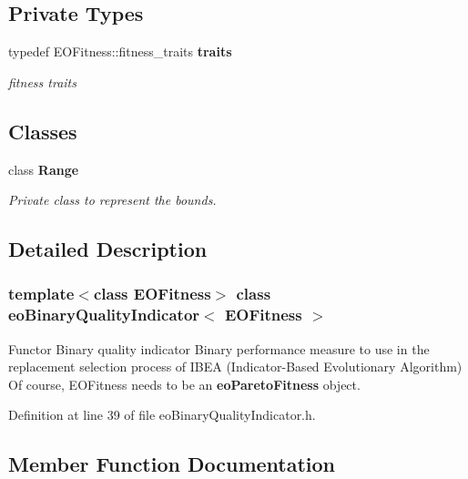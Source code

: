 \subsection*{Private Types}
\begin{CompactItemize}
\item 
typedef EOFitness::fitness\_\-traits {\bf traits}\label{classeoBinaryQualityIndicator_3d9415cfa63d3dd57fe44f9e11df3cac}

\begin{CompactList}\small\item\em fitness traits \item\end{CompactList}\end{CompactItemize}
\subsection*{Classes}
\begin{CompactItemize}
\item 
class {\bf Range}
\begin{CompactList}\small\item\em Private class to represent the bounds. \item\end{CompactList}\end{CompactItemize}


\subsection{Detailed Description}
\subsubsection*{template$<$class EOFitness$>$ class eo\-Binary\-Quality\-Indicator$<$ EOFitness $>$}

Functor Binary quality indicator Binary performance measure to use in the replacement selection process of IBEA (Indicator-Based Evolutionary Algorithm) Of course, EOFitness needs to be an {\bf eo\-Pareto\-Fitness} object. 



Definition at line 39 of file eo\-Binary\-Quality\-Indicator.h.

\subsection{Member Function Documentation}
